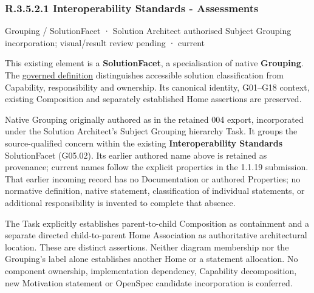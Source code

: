 \subsubsection*{R.3.5.2.1 Interoperability Standards - Assessments}
\label{navigation:R.3.5.2.1}

\label{element:9020808d1ff9466db08ad2f8c9a97542}
{\small Grouping / SolutionFacet · Solution Architect authorised Subject Grouping incorporation; visual/result review pending · current}\par

This existing element is a \textbf{SolutionFacet}, a specialisation of native
\textbf{Grouping}. The \href{\detokenize{../../../../../../../governance/continuum-representation.md#solutionfacet-classification--1119-candidate}}{governed definition}
distinguishes accessible solution classification from Capability, responsibility
and ownership. Its canonical identity, G01–G18 context, existing Composition
and separately established Home assertions are preserved.



Native Grouping originally authored as \texttt{} in the retained 004 export,
incorporated under the Solution Architect's Subject Grouping hierarchy Task.
It groups the source-qualified \texttt{} concern within
the existing \textbf{Interoperability Standards} SolutionFacet (G05.02). Its earlier authored name above is retained as provenance; current names
follow the explicit properties in the 1.1.19 submission.
That earlier incoming record has no Documentation or authored Properties; no normative
definition, native statement, classification of individual statements, or
additional responsibility is invented to complete that absence.



The Task explicitly establishes parent-to-child Composition as containment and
a separate directed child-to-parent Home Association as authoritative architectural
location. These are distinct assertions. Neither diagram membership nor the
Grouping's label alone establishes another Home or a statement allocation.
No component ownership, implementation dependency, Capability decomposition,
new Motivation statement or OpenSpec candidate incorporation is conferred.



